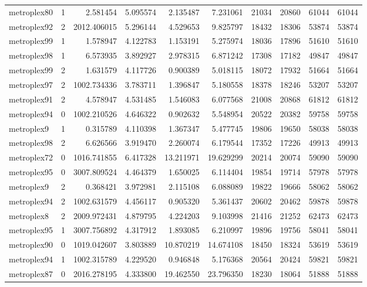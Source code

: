 \begin{longtable}{|l|r|r|r|r|r|r|r|r|r|}
metroplex80 & 1 & 2.581454 & 5.095574 & 2.135487 & 7.231061 & 21034 & 20860 & 61044 & 61044 \\
metroplex92 & 2 & 2012.406015 & 5.296144 & 4.529653 & 9.825797 & 18432 & 18306 & 53874 & 53874 \\
metroplex99 & 1 & 1.578947 & 4.122783 & 1.153191 & 5.275974 & 18036 & 17896 & 51610 & 51610 \\
metroplex98 & 1 & 6.573935 & 3.892927 & 2.978315 & 6.871242 & 17308 & 17182 & 49847 & 49847 \\
metroplex99 & 2 & 1.631579 & 4.117726 & 0.900389 & 5.018115 & 18072 & 17932 & 51664 & 51664 \\
metroplex97 & 2 & 1002.734336 & 3.783711 & 1.396847 & 5.180558 & 18378 & 18246 & 53207 & 53207 \\
metroplex91 & 2 & 4.578947 & 4.531485 & 1.546083 & 6.077568 & 21008 & 20868 & 61812 & 61812 \\
metroplex94 & 0 & 1002.210526 & 4.646322 & 0.902632 & 5.548954 & 20522 & 20382 & 59758 & 59758 \\
metroplex9 & 1 & 0.315789 & 4.110398 & 1.367347 & 5.477745 & 19806 & 19650 & 58038 & 58038 \\
metroplex98 & 2 & 6.626566 & 3.919470 & 2.260074 & 6.179544 & 17352 & 17226 & 49913 & 49913 \\
metroplex72 & 0 & 1016.741855 & 6.417328 & 13.211971 & 19.629299 & 20214 & 20074 & 59090 & 59090 \\
metroplex95 & 0 & 3007.809524 & 4.464379 & 1.650025 & 6.114404 & 19854 & 19714 & 57978 & 57978 \\
metroplex9 & 2 & 0.368421 & 3.972981 & 2.115108 & 6.088089 & 19822 & 19666 & 58062 & 58062 \\
metroplex94 & 2 & 1002.631579 & 4.456117 & 0.905320 & 5.361437 & 20602 & 20462 & 59878 & 59878 \\
metroplex8 & 2 & 2009.972431 & 4.879795 & 4.224203 & 9.103998 & 21416 & 21252 & 62473 & 62473 \\
metroplex95 & 1 & 3007.756892 & 4.317912 & 1.893085 & 6.210997 & 19896 & 19756 & 58041 & 58041 \\
metroplex90 & 0 & 1019.042607 & 3.803889 & 10.870219 & 14.674108 & 18450 & 18324 & 53619 & 53619 \\
metroplex94 & 1 & 1002.315789 & 4.229520 & 0.946848 & 5.176368 & 20564 & 20424 & 59821 & 59821 \\
metroplex87 & 0 & 2016.278195 & 4.333800 & 19.462550 & 23.796350 & 18230 & 18064 & 51888 & 51888 \\

\end{longtable}
